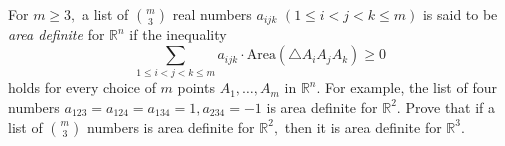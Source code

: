 For $m\ge 3,$ a list of $\binom m3$ real numbers $a_{ijk}$ $(1\le i<j<k\le m)$ is said to be \textit{area definite} for $\mathbb{R}^n$ if the inequality \[\sum_{1\le i<j<k\le m}a_{ijk}\cdot\text{Area}(\triangle A_iA_jA_k)\ge0\] holds for every choice of $m$ points $A_1,\dots,A_m$ in $\mathbb{R}^n.$ For example, the list of four numbers $a_{123}=a_{124}=a_{134}=1, a_{234}=-1$ is area definite for $\mathbb{R}^2.$ Prove that if a list of $\binom m3$ numbers is area definite for $\mathbb{R}^2,$ then it is area definite for $\mathbb{R}^3.$